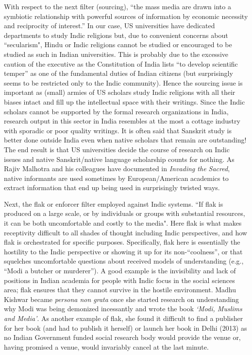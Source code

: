 With respect to the next filter (sourcing), ``the mass media are drawn into a symbiotic relationship with powerful sources of information by economic necessity and reciprocity of interest.” In our case, US universities have dedicated departments to study Indic religions but, due to convenient concerns about ``secularism", Hindu or Indic religions cannot be studied or encouraged to be studied as such in Indian universities. This is probably due to the excessive caution of the executive as the Constitution of India lists “to develop scientific temper” as one of the fundamental duties of Indian citizens (but surprisingly seems to be restricted only to the Indic community). Hence the sourcing issue is important as (small) armies of US scholars study Indic religions with all their biases intact and fill up the intellectual space with their writings. Since the Indic scholars cannot be supported by the formal research organizations in India, research output in this sector in India resembles at the most a cottage industry with sporadic or poor quality writings. It is often said that Sanskrit study is better done outside India even when native scholars that remain are outstanding! The end result is that US universities decide the course of research on Indic issues and native Sanskrit/native language scholarship counts for nothing. As Rajiv Malhotra and his colleagues have documented in {\sl Invading the Sacred}, native informants are used sometimes by European/American academics to extract information that end up being used in surprisingly twisted ways.

Next, the flak or enforcer filter employed against Indic systems. ``If flak is produced on a large scale, or by individuals or groups with substantial resources, it can be both uncomfortable and costly to the media". Here flak is what makes receptivity difficult to all shades of thought including Indic perspectives, and how flak is orchestrated for specific purposes. Specifically, flak here is essentially the hostility to the Indic perspective or showing it up for its non-“coolness”, or that squelches uncomfortable questions about received models of understanding (e.g., ``Modi a butcher or murderer”). A good example is the invisibility and lack of positions in Indian academia for people with Indic focus in the social sciences area; flak ensures that they cannot survive in the hostile environment. Madhu Kishwar became {\sl persona non grata} once she started research on understanding why Modi was being demonized incessantly and wrote the book {\sl `Modi, Muslims and Media'}. As another example of flak, she found it difficult to find a publisher for her book (and had to publish it herself) or launch her book in Delhi (2013) as no Indian Government funded social research body would provide the venue or, having promised a venue, would invariably cancel at the last minute.
\newpage

